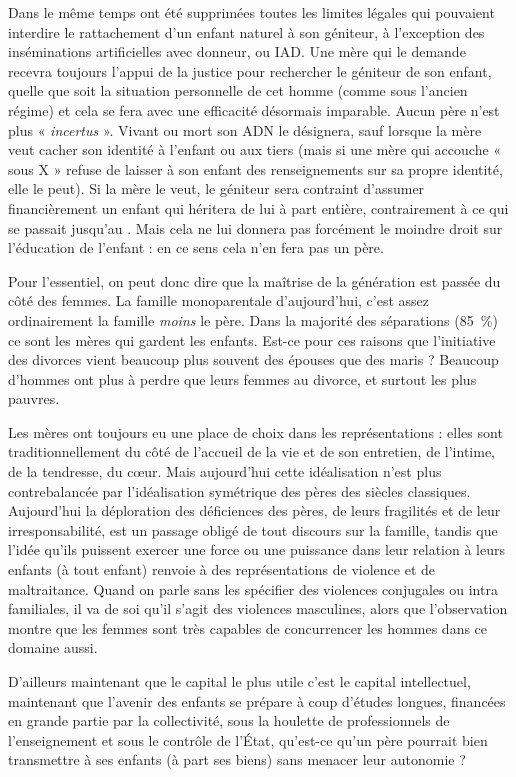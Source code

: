 Dans le même temps ont été supprimées toutes les limites légales qui pouvaient interdire le rattachement d'un enfant naturel à son géniteur, à l'exception des inséminations artificielles avec donneur, ou IAD. Une mère qui le demande recevra toujours l'appui de la justice pour rechercher le géniteur de son enfant, quelle que soit la situation personnelle de cet homme (comme sous l'ancien régime) et cela se fera avec une efficacité désormais imparable. Aucun père n'est plus « \emph{incertus} ». Vivant ou mort son ADN le désignera, sauf lorsque la mère veut cacher son identité à l'enfant ou aux tiers (mais si une mère qui accouche « sous X » refuse de laisser à son enfant des renseignements sur sa propre identité, elle le peut). Si la mère le veut, le géniteur sera contraint d'assumer financièrement un enfant qui héritera de lui à part entière, contrairement à ce qui se passait jusqu'au . Mais cela ne lui donnera pas forcément le moindre droit sur l'éducation de l'enfant : en ce sens cela n'en fera pas un père.

 Pour l'essentiel, on peut donc dire que la maîtrise de la génération est passée du côté des femmes. La famille monoparentale d'aujourd'hui, c'est assez ordinairement la famille \emph{moins} le père. Dans la majorité des séparations (85~\%) ce sont les mères qui gardent les enfants. Est-ce pour ces raisons que l'initiative des divorces vient beaucoup plus souvent des épouses que des maris ? Beaucoup d'hommes ont plus à perdre que leurs femmes au divorce, et surtout les plus pauvres. 

 Les mères ont toujours eu une place de choix dans les représentations : elles sont traditionnellement du côté de l'accueil de la vie et de son entretien, de l'intime, de la tendresse, du cœur. Mais aujourd'hui cette idéalisation n'est plus contrebalancée par l'idéalisation symétrique des pères des siècles classiques. Aujourd'hui la déploration des déficiences des pères, de leurs fragilités et de leur irresponsabilité, est un passage obligé de tout discours sur la famille, tandis que l'idée qu'ils puissent exercer une force ou une puissance dans leur relation à leurs enfants (à tout enfant) renvoie à des représentations de violence et de maltraitance. Quand on parle sans les spécifier des violences conjugales ou intra familiales, il va de soi qu'il s'agit des violences masculines, alors que l'observation montre que les femmes sont très capables de concurrencer les hommes dans ce domaine aussi. 

 D'ailleurs maintenant que le capital le plus utile c'est le capital intellectuel, maintenant que l'avenir des enfants se prépare à coup d'études longues, financées en grande partie par la collectivité, sous la houlette de professionnels de l'enseignement et sous le contrôle de l'État, qu'est-ce qu'un père pourrait bien transmettre à ses enfants (à part ses biens) sans menacer leur autonomie ?

